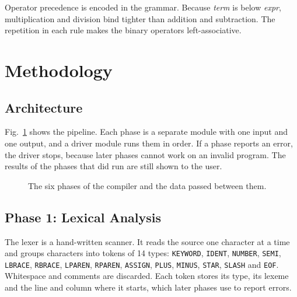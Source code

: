 \documentclass[conference]{IEEEtran}
\newcommand{\kw}[1]{\texttt{#1}}
\begin{document}
Operator precedence is encoded in the grammar. Because \textit{term} is below \textit{expr}, multiplication and division bind tighter than addition and subtraction. The repetition in each rule makes the binary operators left-associative.

\section{Methodology}\label{sec:method}

\subsection{Architecture}
Fig.~\ref{fig:pipeline} shows the pipeline. Each phase is a separate module with one input and one output, and a driver module runs them in order. If a phase reports an error, the driver stops, because later phases cannot work on an invalid program. The results of the phases that did run are still shown to the user.

\begin{figure}[htbp]
\centering
{}
\caption{The six phases of the compiler and the data passed between them.}
\label{fig:pipeline}
\end{figure}

\subsection{Phase 1: Lexical Analysis}
The lexer is a hand-written scanner. It reads the source one character at a time and groups characters into tokens of 14 types: \kw{KEYWORD}, \kw{IDENT}, \kw{NUMBER}, \kw{SEMI}, \kw{LBRACE}, \kw{RBRACE}, \kw{LPAREN}, \kw{RPAREN}, \kw{ASSIGN}, \kw{PLUS}, \kw{MINUS}, \kw{STAR}, \kw{SLASH} and \kw{EOF}. Whitespace and comments are discarded. Each token stores its type, its lexeme and the line and column where it starts, which later phases use to report errors.
\end{document}

